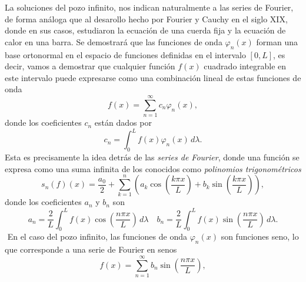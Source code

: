 \documentclass[main.tex]{subfiles}
\begin{document}
La soluciones del pozo infinito, nos indican naturalmente a las series de Fourier, de forma análoga que al desarollo hecho por Fourier y Cauchy en el siglo XIX, donde en sus casos, estudiaron la ecuación de una cuerda fija y la ecuación de calor en una barra. Se demostrará que las funciones de onda \(\varphi_n(x)\) forman una base ortonormal en el espacio de funciones definidas en el intervalo \([0, L]\), es decir, vamos a demostrar que cualquier función \(f(x)\) cuadrado integrable en este intervalo puede expresarse como una combinación lineal de estas funciones de onda
\[
f(x) = \sum_{n=1}^\infty c_n \varphi_n(x),
\]
donde los coeficientes \(c_n\) están dados por
\[
c_n = \int_0^L f(x) \varphi_n(x) \, d\lambda.
\]
Esta es precisamente la idea detrás de las \emph{series de Fourier}, donde una función se expresa como una suma infinita de los conocidos como \emph{polinomios trigonométricos}
\[
s_n(f)(x)=\frac{a_0}{2}+\sum_{k=1}^n\left(a_k\cos\left(\frac{k\pi x}{L}\right)+ b_k\sin\left(\frac{k\pi x}{L}\right)\right),
\]
donde los coeficientes \(a_n\) y \(b_n\) son
\[
  a_n = \frac{2}{L} \int_0^L f(x) \cos\left(\frac{n\pi x}{L}\right) \, d\lambda\quad b_n = \frac{2}{L} \int_0^L f(x) \sin\left(\frac{n\pi x}{L}\right) \, d\lambda.
\]
\obs \(\)
En el caso del pozo infinito, las funciones de onda \(\varphi_n(x)\) son funciones seno, lo que corresponde a una serie de Fourier en senos
\[
f(x) = \sum_{n=1}^\infty b_n \sin\left(\frac{n\pi x}{L}\right),
\]
\end{document}
